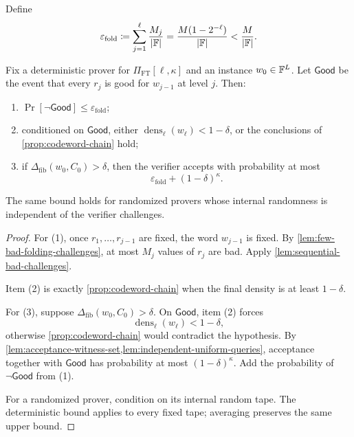 Define
\begin{equation}
  \varepsilon_{\mathrm{fold}}
  \coloneqq
  \sum_{j=1}^{\ell}\frac{M_j}{|\mathbb{F}|}
  =
  \frac{M(1-2^{-\ell})}{|\mathbb{F}|}
  <\frac{M}{|\mathbb{F}|}.
  \label{eq:epsilon-fold}
\end{equation}

\begin{theorem}
\label{thm:folding-soundness}
Fix a deterministic prover for $\Pi_{\mathrm{FT}}[\ell,\kappa]$ and an instance $w_0\in\mathbb{F}^L$.  Let $\mathsf{Good}$ be the event that every $r_j$ is good for $w_{j-1}$ at level $j$.  Then:
\begin{enumerate}[label=(\arabic*),leftmargin=*]
  \item $\Pr[\neg\mathsf{Good}]\le\varepsilon_{\mathrm{fold}}$;
  \item conditioned on $\mathsf{Good}$, either $\operatorname{dens}_\ell(w_\ell)<1-\delta$, or the conclusions of \cref{prop:codeword-chain} hold;
  \item if $\Delta_{\mathrm{fib}}(w_0,C_0)>\delta$, then the verifier accepts with probability at most
  \begin{equation}
    \varepsilon_{\mathrm{fold}}+(1-\delta)^\kappa.
    \label{eq:folding-soundness-bound}
  \end{equation}
\end{enumerate}
The same bound holds for randomized provers whose internal randomness is independent of the verifier challenges.
\end{theorem}

\begin{proof}
For (1), once $r_1,\ldots,r_{j-1}$ are fixed, the word $w_{j-1}$ is fixed.  By \cref{lem:few-bad-folding-challenges}, at most $M_j$ values of $r_j$ are bad.  Apply \cref{lem:sequential-bad-challenges}.

Item (2) is exactly \cref{prop:codeword-chain} when the final density is at least $1-\delta$.

For (3), suppose $\Delta_{\mathrm{fib}}(w_0,C_0)>\delta$.  On $\mathsf{Good}$, item (2) forces
\[
  \operatorname{dens}_\ell(w_\ell)<1-\delta,
\]
otherwise \cref{prop:codeword-chain} would contradict the hypothesis.  By \cref{lem:acceptance-witness-set,lem:independent-uniform-queries}, acceptance together with $\mathsf{Good}$ has probability at most $(1-\delta)^\kappa$.  Add the probability of $\neg\mathsf{Good}$ from (1).

For a randomized prover, condition on its internal random tape.  The deterministic bound applies to every fixed tape; averaging preserves the same upper bound.
\end{proof}


